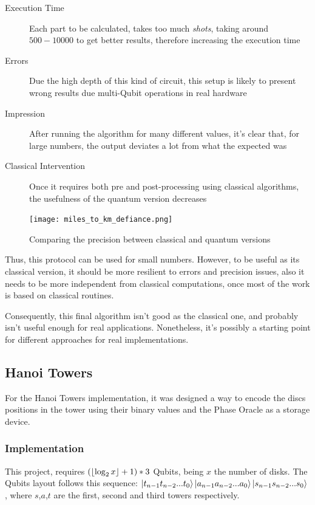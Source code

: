 \documentclass{article}
\DeclarePairedDelimiter\floor{\lfloor}{\rfloor}
\begin{document}
\begin{description}

\item[Execution Time]{Each part to be calculated, takes too much \emph{shots}, taking around $500-10000$ to get better results, therefore increasing the execution time}

\item[Errors]{Due the high depth of this kind of circuit, this setup is likely to present wrong results due multi-Qubit operations in real hardware}

\item[Impression]{After running the algorithm for many different values, it's clear that, for large numbers, the output deviates a lot from what the expected was}

\item[Classical Intervention]{Once it requires both pre and post-processing using classical algorithms, the usefulness of the quantum version decreases}
\end{description}

\newpage

\begin{figure}[h]
	\centering
	\texttt{[image: miles\_to\_km\_defiance.png]}
	\caption{Comparing the precision between classical and quantum versions}
	\label{fig:values-miles-km-quantum}
\end{figure}

Thus, this protocol can be used for small numbers. However, to be useful as its classical version, it should be more resilient to errors and precision issues, also it needs to be more independent from classical computations, once most of the work is based on classical routines.

Consequently, this final algorithm isn't good as the classical one, and probably isn't useful enough for real applications. Nonetheless, it's possibly a starting point for different approaches for real implementations. 

\subsection{Hanoi Towers} \label{hanoi}

For the Hanoi Towers implementation, it was designed a way to encode the discs positions in the tower using their binary values and the Phase Oracle as a storage device.

\subsubsection{Implementation}
This project, requires $(\floor{\log_2{x}} + 1) * 3$ Qubits, being $x$ the number of disks. The Qubits layout follows this sequence: $\ket{t_{n-1} t_{n-2} ... t_0}\ket{a_{n-1} a_{n-2} ... a_0}\ket{s_{n-1} s_{n-2} ... s_0}$, where $s$,$a$,$t$ are the first, second and third towers respectively.
\end{document}
